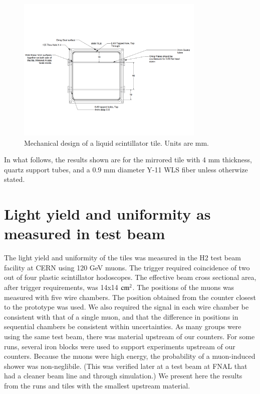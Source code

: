 \documentclass[review]{elsarticle}
\begin{document}
\begin{figure}[!ht]
\begin{center}
\includegraphics[width=0.8\textwidth]{./figures/mechanicaldesign.pdf}
\caption{
Mechanical design of a liquid scintillator tile.  Units are mm.
}
\label{fig:tiledesign}
\end{center}
\end{figure}

In what follows, the results shown are for the mirrored tile with 4 mm thickness, quartz support tubes, and a 0.9 mm diameter Y-11 WLS fiber unless otherwize stated.

\section{Light yield and uniformity as measured in test beam}

The light yield and uniformity of the tiles was measured in the H2 test beam facility at CERN using 120 GeV muons.  The trigger required coincidence of two out of four plastic scintillator hodoscopes. The effective beam cross sectional area, after trigger requirements, was 14x14 ${\rm cm^2}$. The positions of the muons was measured with five wire chambers. The position obtained from the counter closest to the
prototype was used.  We also required the signal in each wire chamber be consistent with that of a single muon, and that the difference in positions in sequential chambers be consistent within uncertainties.
As many groups were using the same test beam, there was material upstream of our counters.  For some runs, several iron blocks were used to support experiments upstream of our counters.  Because the muons were high energy, the probability of a muon-induced shower was non-neglibile.  (This was verified later at a test beam at FNAL that had a cleaner beam line and through simulation.)  We present here the results
from the runs and tiles with the smallest upstream material.
\end{document}
